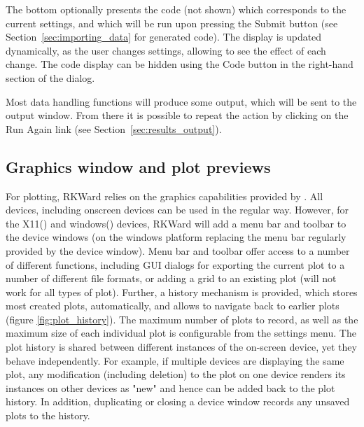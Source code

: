 The bottom optionally presents the 
code (not shown) which corresponds to the current settings, and which will be run
upon pressing the Submit button (see Section~\ref{sec:importing_data} for generated  code). The
display is updated dynamically, as the user changes settings, allowing
to see the effect of each change. The code display can be hidden using
the Code button in the right-hand section
of the dialog.

Most data handling functions will produce some output, which will be
sent to the output window. From there it is possible to repeat the
action by clicking on the Run Again link
(see Section~\ref{sec:results_output}).

\subsection{Graphics window and plot previews}
\label{sec:plot_previews}

For plotting, RKWard relies on the graphics capabilities provided by
. All 
devices, including onscreen devices can be used in the regular way.
However, for the X11() and windows() devices, RKWard will add a menu
bar and toolbar to the device windows (on the windows platform
replacing the menu bar regularly provided by the device window). Menu
bar and toolbar offer access to a number of different functions,
including GUI dialogs for exporting the current plot to a number of
different file formats, or adding a grid to an existing plot (will not
work for all types of plot). Further, a history mechanism is provided,
which stores most created plots, automatically, and allows to navigate
back to earlier plots (figure \ref{fig:plot_history}). The maximum number
of plots to record, as well as the maximum size of each individual plot
is configurable from the settings menu. The plot history is shared
between different instances of the on{}-screen device, yet they behave
independently. For example, if multiple devices are displaying the same
plot, any modification (including deletion) to the plot on one device
renders its instances on other devices as "new" and hence can be added
back to the plot history. In addition, duplicating or closing a device
window records any unsaved plots to the history.

